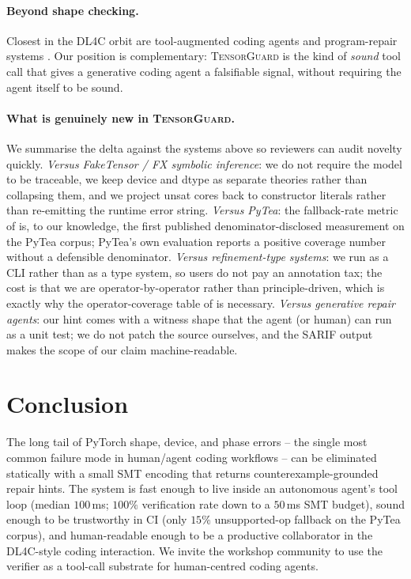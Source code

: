 \documentclass{article}
\theoremstyle{plain}
\theoremstyle{definition}
\newcommand{\TensorGuard}{\textsc{TensorGuard}}
\begin{document}
\paragraph{Beyond shape checking.}
Closest in the DL4C orbit are tool-augmented coding agents
\citep{yao2023react} and program-repair systems
\citep{legoues2012genprog}.  Our position is complementary:
\TensorGuard{} is the kind of \emph{sound} tool call that gives a
generative coding agent a falsifiable signal, without requiring
the agent itself to be sound.

\paragraph{What is genuinely new in \TensorGuard{}.}
We summarise the delta against the systems above so reviewers can
audit novelty quickly.  \emph{Versus FakeTensor / FX symbolic
inference}: we do not require the model to be traceable, we keep
device and dtype as separate theories rather than collapsing them,
and we project unsat cores back to constructor literals rather
than re-emitting the runtime error string.
\emph{Versus PyTea}: the fallback-rate metric of
 is, to our knowledge, the first published
denominator-disclosed measurement on the PyTea corpus; PyTea's
own evaluation reports a positive coverage number without a
defensible denominator.
\emph{Versus refinement-type systems}: we run as a CLI rather than
as a type system, so users do not pay an annotation tax; the cost
is that we are operator-by-operator rather than principle-driven,
which is exactly why the operator-coverage table of
 is necessary.
\emph{Versus generative repair agents}: our hint comes with a
witness shape that the agent (or human) can run as a unit test;
we do not patch the source ourselves, and the SARIF output makes
the scope of our claim machine-readable.

\section{Conclusion}\label{sec:conclusion}

The long tail of PyTorch shape, device, and phase errors -- the
single most common failure mode in human/agent coding workflows
-- can be eliminated statically with a small SMT encoding that
returns counterexample-grounded repair hints.  The system is fast
enough to live inside an autonomous agent's tool loop (median
$100$\,ms; $100\%$ verification rate down to a $50$\,ms SMT
budget), sound enough to be trustworthy in CI (only $15\%$
unsupported-op fallback on the PyTea corpus), and human-readable
enough to be a productive collaborator in the DL4C-style coding
interaction.  We invite the workshop community to use the
verifier as a tool-call substrate for human-centred coding
agents.
\end{document}
